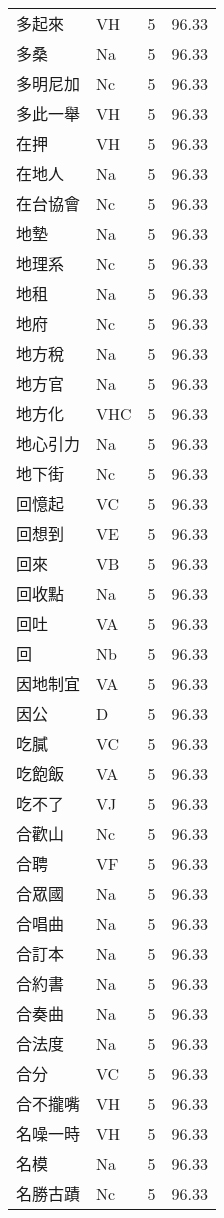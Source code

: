 \documentclass[twocolumn]{book}
\begin{document}
\begin{supertabular}{llrr}
多起來 & VH & 5 &  96.33\\
多桑 & Na & 5 &  96.33\\
多明尼加 & Nc & 5 &  96.33\\
多此一舉 & VH & 5 &  96.33\\
在押 & VH & 5 &  96.33\\
在地人 & Na & 5 &  96.33\\
在台協會 & Nc & 5 &  96.33\\
地墊 & Na & 5 &  96.33\\
地理系 & Nc & 5 &  96.33\\
地租 & Na & 5 &  96.33\\
地府 & Nc & 5 &  96.33\\
地方稅 & Na & 5 &  96.33\\
地方官 & Na & 5 &  96.33\\
地方化 & VHC & 5 &  96.33\\
地心引力 & Na & 5 &  96.33\\
地下街 & Nc & 5 &  96.33\\
回憶起 & VC & 5 &  96.33\\
回想到 & VE & 5 &  96.33\\
回來 & VB & 5 &  96.33\\
回收點 & Na & 5 &  96.33\\
回吐 & VA & 5 &  96.33\\
回 & Nb & 5 &  96.33\\
因地制宜 & VA & 5 &  96.33\\
因公 & D & 5 &  96.33\\
吃膩 & VC & 5 &  96.33\\
吃飽飯 & VA & 5 &  96.33\\
吃不了 & VJ & 5 &  96.33\\
合歡山 & Nc & 5 &  96.33\\
合聘 & VF & 5 &  96.33\\
合眾國 & Na & 5 &  96.33\\
合唱曲 & Na & 5 &  96.33\\
合訂本 & Na & 5 &  96.33\\
合約書 & Na & 5 &  96.33\\
合奏曲 & Na & 5 &  96.33\\
合法度 & Na & 5 &  96.33\\
合分 & VC & 5 &  96.33\\
合不攏嘴 & VH & 5 &  96.33\\
名噪一時 & VH & 5 &  96.33\\
名模 & Na & 5 &  96.33\\
名勝古蹟 & Nc & 5 &  96.33\\

\end{supertabular}
\end{document}
